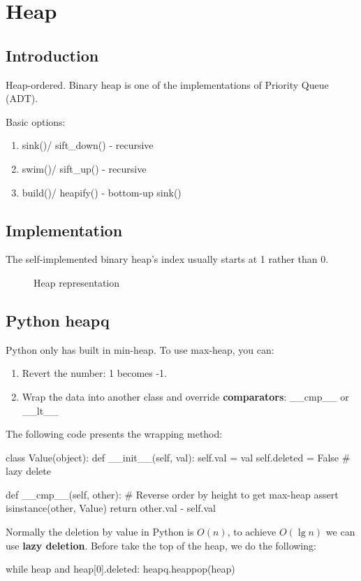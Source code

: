 \chapter{Heap}


\section{Introduction}
Heap-ordered. Binary heap is one of the implementations of Priority Queue (ADT). 

Basic options:
\begin{enumerate}
\item sink()/ sift\_down() - recursive
\item swim()/ sift\_up() - recursive
\item build()/ heapify() - bottom-up sink()
\end{enumerate}
\section{Implementation}
The self-implemented binary heap's index usually starts at 1 rather than 0. 
\begin{figure}[hbtp]
\centering
{}
\caption{Heap representation}
\label{fig:heap} 
\end{figure}

\section{Python heapq}
Python only has built in min-heap. To use max-heap, you can: 
\begin{enumerate}
\item Revert the number: 1 becomes -1.
\item Wrap the data into another class and override \textbf{comparators}: \_\_cmp\_\_ or \_\_lt\_\_
\end{enumerate}

The following code presents the wrapping method:
\begin{python}
class Value(object):
    def __init__(self, val):
        self.val = val
        self.deleted = False  # lazy delete 

    def __cmp__(self, other):
        # Reverse order by height to get max-heap
        assert isinstance(other, Value)
        return other.val - self.val
\end{python}

Normally the deletion by value in Python is $O(n)$, to achieve $O(\lg n)$ we can use \textbf{lazy deletion}. Before take the top of the heap, we do the following:
\begin{python}
while heap and heap[0].deleted:
    heapq.heappop(heap)
\end{python}
